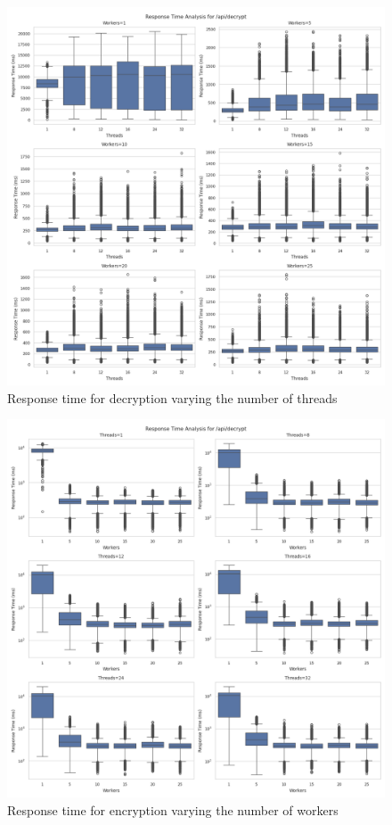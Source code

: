 \documentclass[cic,tc,english]{iiufrgs}
\begin{document}
            \begin{figure}
                \centering
                \includegraphics[width=\textwidth]{images/phase1/api_decrypt/response_time_workers_summary.png}
                \caption{Response time for decryption varying the number of threads}
                \label{fig:decrypt_response_time_workers}
            \end{figure}

            \begin{figure}
                \centering
                \includegraphics[width=\textwidth]{images/phase1/api_decrypt/response_time_threads_summary.png}
                \caption{Response time for encryption varying the number of workers}
                \label{fig:encrypt_response_time_threads}
            \end{figure}
\end{document}
